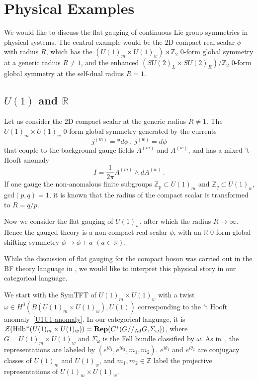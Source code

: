 \documentclass[a4paper,11pt]{article}
\newcommand{\Rep}{\textbf{Rep}}
\newcommand{\be}{\begin{equation}}
\newcommand{\ee}{\end{equation}}
\def\mb{\mathbb}
\def\CZ{\mathcal{Z}}
\def\hilb{{\rm Hilb}}
\def\gmg{G//_{\rm Ad} G}
\begin{document}
\section{Physical Examples}\label{sec:physicalexm}

We would like to discuss the flat gauging of continuous Lie group symmetries in physical systems. The central example would be the $2$D compact real scalar $\phi$ with radius $R$, which has the $(U(1)_m\times U(1)_w)\rtimes\mb{Z}_2$ 0-form global symmetry at a generic radius $R\neq 1$, and the enhanced $(SU(2)_L\times SU(2)_R)/\mb{Z}_2$ 0-form global symmetry at the self-dual radius $R=1$. 

\subsection{$U(1)$ and $\mb{R}$}

Let us consider the $2$D compact scalar at the generic radius $R\neq 1$. The $U(1)_m\times U(1)_w$ 0-form global symmetry generated by the currents
\be
j^{(m)}=*d\phi\ ,\ j^{(w)}=d\phi
\ee
that couple to the background gauge fields $A^{(m)}$ and $A^{(w)}$, and has a mixed 't Hooft anomaly
\be
\label{U1U1-anomaly}
I=\frac{1}{2\pi}A^{(m)}\wedge dA^{(w)}\,.
\ee
If one gauge the non-anomalous finite subgroups $\mb{Z}_p\subset U(1)_m$ and $\mb{Z}_q\subset U(1)_w$, gcd$(p,q)=1$, it is known that the radius of the compact scalar is transformed to $R=q/p$. 

Now we consider the flat gauging of $U(1)_w$, after which the radius $R\rightarrow\infty$. Hence the gauged theory is a non-compact real scalar $\phi$, with an $\mb{R}$ 0-form global shifting symmetry $\phi\rightarrow\phi+a$ $(a\in\mb{R})$.

While the discussion of flat gauging for the compact boson was carried out in the BF theory language in \cite{Argurio:2024ewp}, we would like to interpret this physical story in our categorical language.

We start with the SymTFT of $U(1)_m\times U(1)_w$ with a twist $\omega\in H^3(B(U(1)_m\times U(1)_w),\underline{U(1)})$ corresponding to the 't Hooft anomaly~\eqref{U1U1-anomaly}. In our categorical language, it is $\CZ(\hilb^\omega(U(1)_m\times U(1)_w))=\Rep(C^*(\gmg, \Sigma_\omega))$, where $G = U(1)_m\times U(1)_w$ and $\Sigma_\omega$ is the Fell bundle classified by $\omega$. As in~\cite{Jia:2025vrj}, the representations are labeled by $(e^{i\theta_1},e^{i\theta_2},m_1,m_2)$. $e^{i\theta_1}$ and $e^{i\theta_2}$ are conjugacy classes of $U(1)_m$ and $U(1)_w$, and $m_1,m_2\in\mb{Z}$ label the projective representations of $U(1)_m\times U(1)_w$.
\end{document}
